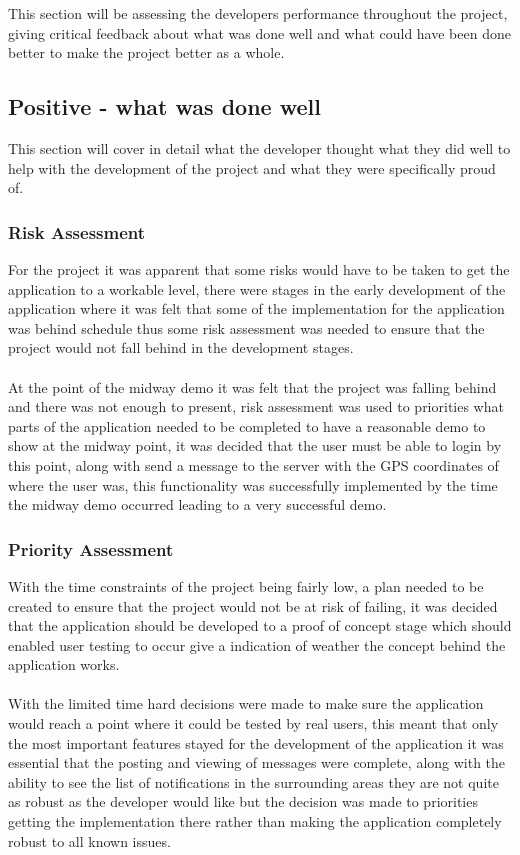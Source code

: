 This section will be assessing the developers performance throughout the project, giving critical feedback about what was done well and what could have been done better to make the project better as a whole.

\subsection{Positive - what was done well}

This section will cover in detail what the developer thought what they did well to help with the development of the project and what they were specifically proud of.

\subsubsection{Risk Assessment}

For the project it was apparent that some risks would have to be taken to get the application to a workable level, there were stages in the early development of the application where it was felt that some of the implementation for the application was behind schedule thus some risk assessment was needed to ensure that the project would not fall behind in the development stages.\\
\\
At the point of the midway demo it was felt that the project was falling behind and there was not enough to present, risk assessment was used to priorities what parts of the application needed to be completed to have a reasonable demo to show at the midway point, it was decided that the user must be able to login by this point, along with send a message to the server with the GPS coordinates of where the user was, this functionality was successfully implemented by the time the midway demo occurred leading to a very successful demo.

\subsubsection{Priority Assessment}

With the time constraints of the project being fairly low, a plan needed to be created to ensure that the project would not be at risk of failing, it was decided that the application should be developed to a proof of concept stage which should enabled user testing to occur give a indication of weather the concept behind the application works.\\
\\
With the limited time hard decisions were made to make sure the application would reach a point where  it could be tested by real users, this meant that only the most important features stayed for the development of the application it was essential that the posting and viewing of messages were complete, along with the ability to see the list of notifications in the surrounding areas they are not quite as robust as the developer would like but the decision was made to priorities getting the implementation there rather than making the application completely robust to all known issues.

